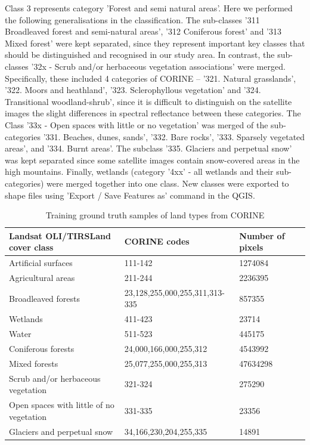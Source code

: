 \documentclass[jimaging,article,submit,pdftex,moreauthors]{Definitions/mdpi}
\begin{document}
{Class 3 represents} category 'Forest and semi natural areas'. Here we performed the following generalisations in the classification. The sub-classes '311 Broadleaved forest and semi-natural areas', '312 Coniferous forest' and '313 Mixed forest' were kept separated, since they represent important key classes that should be {distinguished and recognised in our study area}. In contrast, the sub-classes '32x - Scrub and/or herbaceous vegetation associations' were merged. Specifically, these included 4 categories of CORINE -- '321. Natural grasslands', '322. Moors and heathland', '323. Sclerophyllous vegetation' and '324. Transitional woodland-shrub', since it is difficult to distinguish on the satellite images the slight differences in spectral reflectance between these categories. The Class '33x - Open spaces with little or no vegetation' was merged of the sub-categories '331. Beaches, dunes, sands', '332. Bare rocks', '333. Sparsely vegetated areas', and '334. Burnt areas'. The subclass '335. Glaciers and perpetual snow' was kept separated since some satellite {images contain snow-covered areas} in the high mountains. {Finally, wetlands (category '4xx' - all wetlands and their sub-categories) were merged together into one class. New classes were exported to shape files using 'Export / Save Features as' command in the QGIS}.

\begin{table}[h]
\caption{Training ground truth samples of land types from CORINE}\label{tabcor}%
\begin{tabular}{@{}llll@{}}
\toprule
Landsat OLI/TIRS\footnotemark[1] Land cover class & CORINE codes & Number of pixels  \\
\midrule
        Artificial surfaces & 111-142 & 1274084 \\ \hline
        Agricultural areas & 211-244 & 2236395  \\ \hline
        Broadleaved forests & 23,128,255,000,255,311,313-335 & 857355  \\ \hline
        Wetlands & 411-423 & 23714  \\ \hline
	Water & 511-523 & 445175  \\ \hline
        Coniferous forests & 24,000,166,000,255,312 & 4543992  \\ \hline
        Mixed forests & 25,077,255,000,255,313 & 47634298  \\ \hline
        Scrub and/or herbaceous vegetation & 321-324 & 275290  \\ \hline
        Open spaces with little of no vegetation & 331-335 & 23356  \\ \hline
        Glaciers and perpetual snow & 34,166,230,204,255,335 & 14891  \\ \hline
\bottomrule
\end{tabular}
\end{table}
\end{document}
